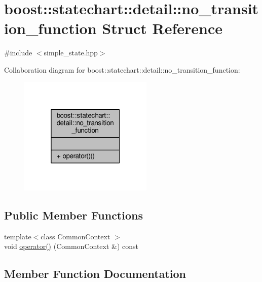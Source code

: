 \hypertarget{structboost_1_1statechart_1_1detail_1_1no__transition__function}{}\section{boost\+:\+:statechart\+:\+:detail\+:\+:no\+\_\+transition\+\_\+function Struct Reference}
\label{structboost_1_1statechart_1_1detail_1_1no__transition__function}


{\ttfamily \#include $<$simple\+\_\+state.\+hpp$>$}



Collaboration diagram for boost\+:\+:statechart\+:\+:detail\+:\+:no\+\_\+transition\+\_\+function\+:
\nopagebreak
\begin{figure}[H]
\begin{center}
\leavevmode
\includegraphics[width=181pt]{structboost_1_1statechart_1_1detail_1_1no__transition__function__coll__graph}
\end{center}
\end{figure}
\subsection*{Public Member Functions}
\begin{DoxyCompactItemize}
\item 
{\footnotesize template$<$class Common\+Context $>$ }\\void \mbox{\hyperlink{structboost_1_1statechart_1_1detail_1_1no__transition__function_a188ba0e796886c62393f4fa1511d4850}{operator()}} (Common\+Context \&) const
\end{DoxyCompactItemize}


\subsection{Member Function Documentation}
\mbox{\label{structboost_1_1statechart_1_1detail_1_1no__transition__function_a188ba0e796886c62393f4fa1511d4850}} 
